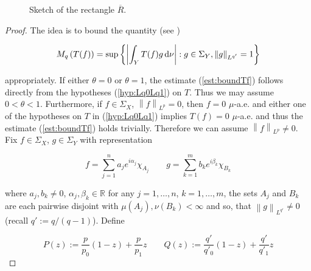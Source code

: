 \begin{figure}[h!tb]
	\centering
	\caption{Sketch of the rectangle $\overline{R}$.}
	\label{fig:Hadamards_three_lines_lemma_proof}
\end{figure}

\begin{proof}
	The idea is to bound the quantity (see \cite[189]{folland:real_analysis:1999})
	
	\begin{equation*}
		M_q\left( T(f) \right) = \sup\left\{ \left| \int_Y T(f)g \mathop{}\!\mathrm{d} \nu\right| : g \in \Sigma_Y, \left\| g\right\|_{L^{q'}} = 1\right\}
	\end{equation*}

	\noindent appropriately. If either $\theta = 0$ or $\theta = 1$, the estimate (\ref{est:boundTf}) follows directly from the hypotheses (\ref{hyp:Lq0Lq1}) on $T$. Thus we may assume \underline{$0 < \theta < 1$}. Furthermore, if $f \in \Sigma_X$, $\left\| f \right\|_{L^p} = 0$, then $f = 0$ $\mu$-a.e. and either one of the hypotheses on $T$ in (\ref{hyp:Lq0Lq1}) implies $T(f) = 0$ $\mu$-a.e. and thus the estimate (\ref{est:boundTf}) holds trivially. Therefore we can assume \underline{$\left\| f\right\|_{L^p} \neq 0$}. Fix $f \in \Sigma_X$, $g \in \Sigma_Y$ with representation
	
\begin{equation*}
	f = \sum_{j = 1}^n a_j e^{i\alpha_j}\chi_{A_j} \qquad g = \sum_{k = 1}^m b_k e^{i\beta_k}\chi_{B_k}
\end{equation*}

\noindent where $a_j,b_k \neq 0$, $\alpha_j,\beta_k \in \mathbb{R}$ for any $j = 1,\dots,n$, $k = 1,\dots,m$, the sets $A_j$ and $B_k$ are each pairwise disjoint with $\mu\left( A_j \right),\nu\left( B_k \right) < \infty$ and so, that $\left\| g\right\|_{L^{q'}} \neq 0$ (recall $q' := q/\left( q - 1 \right)$). Define

\begin{equation*}
	P(z) := \frac{p}{p_0}(1 - z) + \frac{p}{p_1}z \qquad Q(z) := \frac{q'}{q'_0}(1 - z) + \frac{q'}{q'_1}z
\end{equation*}


\end{proof}
